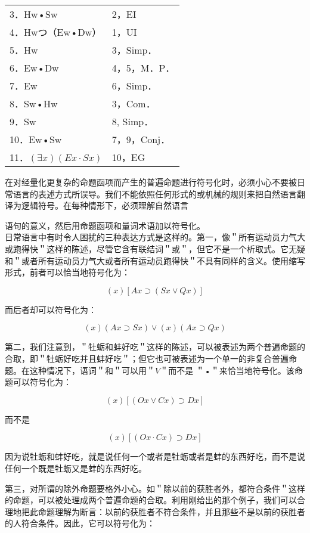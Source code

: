 \begin{center}
\begin{tabular}{ll}
3．Hw•Sw & 2，EI \\
4．Hwつ（Ew•Dw） & 1，UI \\
5．Hw & 3，Simp． \\
6．Ew•Dw & 4，5，M．P． \\
7．Ew & 6，Simp． \\
8．Sw•Hw & 3，Com． \\
9．Sw & 8, Simp． \\
10．Ew•Sw & 7，9，Conj． \\
11．$(\exists x)(E x \cdot S x)$ & 10，EG \\
\end{tabular}
\end{center}

在对经量化更复杂的命题函项而产生的普遍命题进行符号化时，必须小心不要被日常语言的表述方式所误导。我们不能依照任何形式的或机械的规则来把自然语言翻译为逻辑符号。在每种情形下，必须理解自然语言

语句的意义，然后用命题函项和量词术语加以符号化。\\
日常语言中有时令人困扰的三种表达方式是这样的。第一，像＂所有运动员力气大或跑得快＂这样的陈述，尽管它含有联结词＂或＂，但它不是一个析取式。它无疑和＂或者所有运动员力气大或者所有运动员跑得快＂不具有同样的含义。使用缩写形式，前者可以恰当地符号化为：

$$
(x)[A x \supset(S x \vee Q x)]
$$

而后者却可以符号化为：

$$
(x)(A x \supset S x) \vee(x)(A x \supset Q x)
$$

第二，我们注意到，＂牡蛎和蚌好吃＂这样的陈述，可以被表述为两个普遍命题的合取，即＂牡蛎好吃并且蚌好吃＂；但它也可被表述为一个单一的非复合普遍命题。在这种情况下，语词＂和＂可以用＂$V$＂而不是 ＂•＂来恰当地符号化。该命题可以符号化为：

$$
(x)[(O x \vee C x) \supset D x]
$$

而不是

$$
(x)[(O x \cdot C x) \supset D x]
$$

因为说牡蛎和蚌好吃，就是说任何一个或者是牡蛎或者是蚌的东西好吃，而不是说任何一个既是牡蛎又是蚌的东西好吃。

第三，对所谓的除外命题要格外小心。如＂除以前的获胜者外，都符合条件＂这样的命题，可以被处理成两个普遍命题的合取。利用刚给出的那个例子，我们可以合理地把此命题理解为断言：以前的获胜者不符合条件，并且那些不是以前的获胜者的人符合条件。因此，它可以符号化为：

